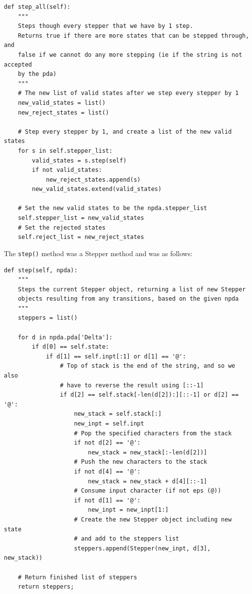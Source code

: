 \documentclass[a4paper]{article}
\begin{document}
\begin{verbatim}
def step_all(self):
    """
    Steps though every stepper that we have by 1 step.
    Returns true if there are more states that can be stepped through, and
    false if we cannot do any more stepping (ie if the string is not accepted
    by the pda)
    """
    # The new list of valid states after we step every stepper by 1
    new_valid_states = list()
    new_reject_states = list()

    # Step every stepper by 1, and create a list of the new valid states
    for s in self.stepper_list:
        valid_states = s.step(self)
        if not valid_states:
            new_reject_states.append(s)
        new_valid_states.extend(valid_states)

    # Set the new valid states to be the npda.stepper_list
    self.stepper_list = new_valid_states
    # Set the rejected states
    self.reject_list = new_reject_states
\end{verbatim}

The \texttt{step()} method was a Stepper method and was as follows:

\begin{verbatim}
def step(self, npda):
    """
    Steps the current Stepper object, returning a list of new Stepper
    objects resulting from any transitions, based on the given npda
    """
    steppers = list()

    for d in npda.pda['Delta']:
        if d[0] == self.state:
            if d[1] == self.inpt[:1] or d[1] == '@':
                # Top of stack is the end of the string, and so we also
                # have to reverse the result using [::-1]
                if d[2] == self.stack[-len(d[2]):][::-1] or d[2] == '@':
                    new_stack = self.stack[:]
                    new_inpt = self.inpt
                    # Pop the specified characters from the stack
                    if not d[2] == '@':
                        new_stack = new_stack[:-len(d[2])]
                    # Push the new characters to the stack
                    if not d[4] == '@':
                        new_stack = new_stack + d[4][::-1]
                    # Consume input character (if not eps (@))
                    if not d[1] == '@':
                        new_inpt = new_inpt[1:]
                    # Create the new Stepper object including new state
                    # and add to the steppers list
                    steppers.append(Stepper(new_inpt, d[3], new_stack))

    # Return finished list of steppers
    return steppers;
\end{verbatim}
\end{document}
